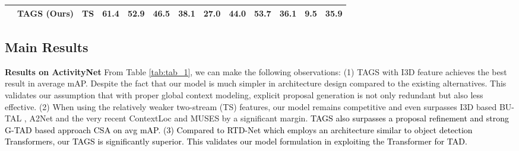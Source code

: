 \documentclass[runningheads]{llncs}
\newcommand{\shortmodelname}{TAGS}
\begin{document}
\begin{table*}[t]
{{\begin{tabular}{@{}c|l|c|cccccc|cccc@{}}
                              & \bf {\shortmodelname} (Ours)       & TS  & \textbf{61.4}   & \bf 52.9   & \textbf{46.5}   & \textbf{38.1}   & \bf 27.0   & \textbf{44.0}
                              & \textbf{53.7}            & 36.1            & \bf 9.5   & \textbf{35.9}\\ 
                              \bottomrule
\end{tabular}
}
\caption{Performance comparison with state-of-the-art methods on THUMOS14 and ActivityNet-v1.3.
The results are measured by mAP at different IoU thresholds, and average mAP in {[}0.3 : 0.1 : 0.7{]} on THUMOS14 and {[}0.5 : 0.05 : 0.95{]} on ActivityNet-v1.3.
Actn = Actioness;
PF = Proposal Free;
Bkb = Backbone.
}
\label{tab:tab_1}
}
\end{table*}


\subsection{Main Results}


\noindent\textbf{Results on ActivityNet } 
From Table \ref{tab:tab_1},
we can make the following  observations:
(1) {\shortmodelname} with I3D feature achieves the best result in average mAP. Despite the fact that our model is much simpler in architecture design compared to the existing alternatives. This validates our assumption that with proper global context modeling, explicit proposal generation is not only redundant but also less effective. 
(2) When using the relatively weaker two-stream (TS) features,
our model remains competitive and even surpasses I3D based
BU-TAL \cite{zhao2020bottom}, A2Net \cite{yang2020revisiting} and the very recent  ContextLoc \cite{zhu2021enriching} and MUSES \cite{liu2021multi} by a significant margin.
\textcolor{black}{{\shortmodelname} also surpasses a proposal refinement and strong G-TAD based approach CSA \cite{sridhar2021class} 
on avg mAP.}
\textcolor{black}{(3) Compared to RTD-Net which employs an architecture similar to object detection Transformers, our {\shortmodelname} is significantly superior. This validates our model formulation in exploiting the Transformer for TAD.}
\end{document}
